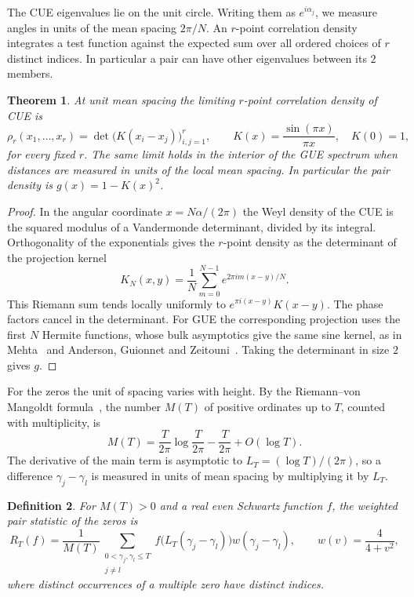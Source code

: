 \documentclass[11pt,a4paper]{article}
\newtheorem{thm}{Theorem}[section]
\newtheorem{defn}[thm]{Definition}
\begin{document}
The CUE eigenvalues lie on the unit circle. Writing them as $e^{i\alpha_j}$, we measure angles in units of the mean spacing $2\pi/N$. An $r$-point correlation density integrates a test function against the expected sum over all ordered choices of $r$ distinct indices. In particular a pair can have other eigenvalues between its $2$ members.

\begin{samepage}
\begin{thm}\label{sine-law}
At unit mean spacing the limiting $r$-point correlation density of CUE is
\[
 \rho_r(x_1,\ldots,x_r)=\det\big(K(x_i-x_j)\big)_{i,j=1}^r,\qquad
 K(x)=\frac{\sin(\pi x)}{\pi x},\quad K(0)=1,
\]
for every fixed $r$. The same limit holds in the interior of the GUE spectrum when distances are measured in units of the local mean spacing. In particular the pair density is $g(x)=1-K(x)^2$.
\end{thm}
\end{samepage}
\begin{proof}
In the angular coordinate $x=N\alpha/(2\pi)$ the Weyl density of the CUE is the squared modulus of a Vandermonde determinant, divided by its integral. Orthogonality of the exponentials gives the $r$-point density as the determinant of the projection kernel
\[
 K_N(x,y)=\frac1N\sum_{m=0}^{N-1}e^{2\pi im(x-y)/N}.
\]
This Riemann sum tends locally uniformly to $e^{\pi i(x-y)}K(x-y)$. The phase factors cancel in the determinant. For GUE the corresponding projection uses the first $N$ Hermite functions, whose bulk asymptotics give the same sine kernel, as in Mehta~\cite{mehta} and Anderson, Guionnet and Zeitouni~\cite{agz}. Taking the determinant in size $2$ gives $g$.
\end{proof}

For the zeros the unit of spacing varies with height. By the Riemann--von Mangoldt formula~\cite{titchmarsh}, the number $M(T)$ of positive ordinates up to $T$, counted with multiplicity, is
\[
 M(T)=\frac{T}{2\pi}\log\frac{T}{2\pi}-\frac{T}{2\pi}+O(\log T).
\]
The derivative of the main term is asymptotic to $L_T=(\log T)/(2\pi)$, so a difference $\gamma_j-\gamma_l$ is measured in units of mean spacing by multiplying it by $L_T$.

\begin{samepage}
\begin{defn}
For $M(T)>0$ and a real even Schwartz function $f$, the weighted pair statistic of the zeros is
\[
 R_T(f)=\frac1{M(T)}
 \sum_{\substack{0<\gamma_j,\gamma_l\leq T\\j\ne l}}
 f\big(L_T(\gamma_j-\gamma_l)\big)w(\gamma_j-\gamma_l),
 \qquad w(v)=\frac4{4+v^2},
\]
where distinct occurrences of a multiple zero have distinct indices.
\end{defn}
\end{samepage}
\end{document}
